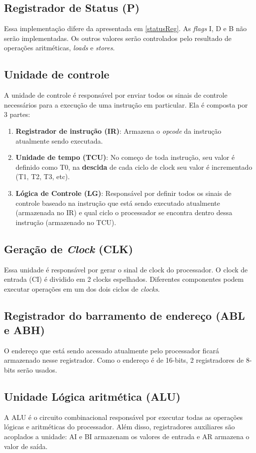 \documentclass[
	12pt,				  %
	openright,		%
	a4paper,			%
	english,			%
	french,				%
	spanish,			%
	brazil,				%
]{abntex2}
\begin{document}
\subsection{Registrador de Status (P)}
Essa implementação difere da apresentada em \ref{statusReg}. As \emph{flags} I,
D e B não serão implementadas.
Os outros valores serão controlados pelo resultado de operações aritméticas,
\emph{loads} e \emph{stores}.

\subsection{Unidade de controle}
A unidade de controle é responsável por enviar todos os sinais de controle
necessários para a execução de uma instrução em particular. Ela é composta por 3
partes:
\begin{enumerate}
	\item \textbf{Registrador de instrução (IR)}: Armazena o \emph{opcode} da
	      instrução atualmente sendo executada.
	\item \textbf{Unidade de tempo (TCU)}: No começo de toda instrução, seu valor
	      é definido como T0, na \textbf{descida} de cada ciclo de clock seu valor é
	      incrementado (T1, T2, T3, etc).
	\item \textbf{Lógica de Controle (LG)}: Responsável por definir todos os
	      sinais de controle baseado na instrução que está sendo executado atualmente
	      (armazenada no IR) e qual ciclo o processador se encontra dentro dessa
	      instrução (armazenado no TCU).
\end{enumerate}

\subsection{Geração de \emph{Clock} (CLK)}
Essa unidade é responsável por gerar o sinal de clock do processador. O clock de
entrada (CI) é dividido em 2 clocks espelhados. Diferentes componentes podem
executar operações em um dos dois ciclos de \emph{clocks}.

\subsection{Registrador do barramento de endereço (ABL e ABH)}
O endereço que está sendo acessado atualmente pelo processador ficará armazenado
nesse registrador. Como o endereço é de 16-bits, 2 registradores de 8-bits serão
usados.

\subsection{Unidade Lógica aritmética (ALU)}
A ALU é o circuito combinacional responsável por executar todas as operações
lógicas e aritméticas do processador. Além disso, registradores auxiliares são
acoplados a unidade: AI e BI armazenam os valores de entrada e AR armazena o
valor de saída.
\end{document}
